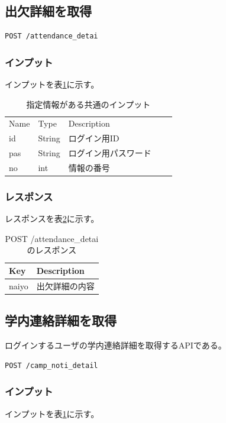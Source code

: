 \documentclass[a4j,12pt,onecolumn,oneside,titlepage,openany,final]{jreport}
\begin{document}
\subsection{出欠詳細を取得}

\begin{lstlisting}[language=http, firstnumber=1]
POST /attendance_detai
\end{lstlisting}
\subsubsection{インプット}

インプットを表\ref{input2}に示す。

\begin{table}[htbp]
  \caption{指定情報がある共通のインプット}
\centering
\begin{tabular}{|l|l|l|ll}
\cline{1-3}
Name & Type   & Description &  &  \\ \cline{1-3}
id   & String & ログイン用ID     &  &  \\ \cline{1-3}
pas  & String & ログイン用パスワード  &  &  \\ \cline{1-3}
no   & int    & 情報の番号       &  &  \\ \cline{1-3}
\end{tabular}
\label{input2}
\end{table}
\subsubsection{レスポンス}
レスポンスを表\ref{attend}に示す。
\begin{table}[htbp]
\caption{POST /attendance\_detaiのレスポンス}
\centering
\begin{tabular}{|l|l|}
\hline
Key                    & Description                    \\ \hline
naiyo                   & 出欠詳細の内容 \\ \hline
\end{tabular}
\label{attend}
\end{table}

\subsection{学内連絡詳細を取得}
ログインするユーザの学内連絡詳細を取得するAPIである。
\begin{lstlisting}[language=http, firstnumber=1]
POST /camp_noti_detail
\end{lstlisting}
\subsubsection{インプット}
インプットを表\ref{input2}に示す。
\end{document}
